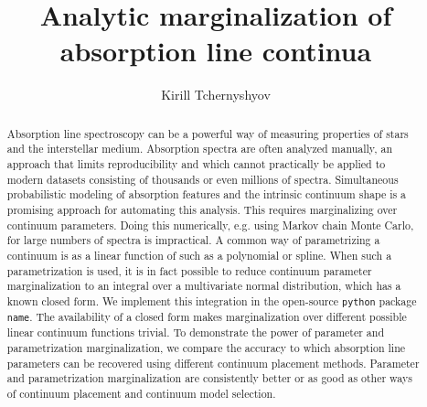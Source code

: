 \documentclass[manuscript]{aastex62}
\newcommand{\pkgname}{\texttt{name}}
\begin{document}
\title{Analytic marginalization of absorption line continua}

\author[0000-0003-0789-9939]{Kirill Tchernyshyov}


\begin{abstract}
Absorption line spectroscopy can be a powerful way of measuring properties of stars and the interstellar medium.
Absorption spectra are often analyzed manually, an approach that limits reproducibility and which cannot practically be applied to modern datasets consisting of thousands or even millions of spectra.
Simultaneous probabilistic modeling of absorption features and the intrinsic continuum shape is a promising approach for automating this analysis.
This requires marginalizing over continuum parameters.
Doing this numerically, e.g. using Markov chain Monte Carlo, for large numbers of spectra is impractical.
A common way of parametrizing a continuum is as a linear function of such as a polynomial or spline.
When such a parametrization is used, it is in fact possible to reduce continuum parameter marginalization to an integral over a multivariate normal distribution, which has a known closed form.
We implement this integration in the open-source \texttt{python} package \pkgname.
The availability of a closed form makes marginalization over different possible linear continuum functions trivial.
To demonstrate the power of parameter and parametrization marginalization, we compare the accuracy to which absorption line parameters can be recovered using different continuum placement methods.
Parameter and parametrization marginalization are consistently better or as good as other ways of continuum placement and continuum model selection.
\end{abstract}

\end{document}
